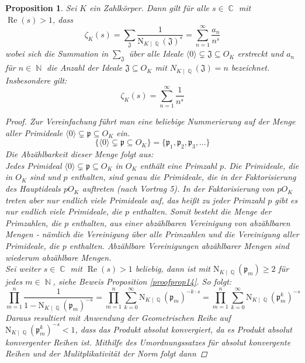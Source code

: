 \documentclass[10pt,a4paper]{article}
\theoremstyle{plain}
\newtheorem{prop}[thm]{Proposition}
\theoremstyle{definition}
\theoremstyle{remark}
\DeclareMathOperator{\C}{\mathbb{C}}
\DeclareMathOperator{\Q}{\mathbb{Q}}
\DeclareMathOperator{\N}{\mathbb{N}}
\DeclareMathOperator{\re}{Re}
\begin{document}
\begin{prop}

Sei $\textit{K}$ ein Zahlkörper. Dann gilt für alle $s \in \C $ mit $ \re(s)>1$, dass$$\zeta_{K}(s) = \sum_{\mathfrak{J}}\frac{1}{\mathrm{N}_{K\mid\Q}(\mathfrak{J})^s}=\sum_{n=1}^{\infty}\frac{a_n}{n^s}$$
wobei sich die Summation in $\sum_{\mathfrak{J}}$ über alle Ideale $\langle0\rangle\subsetneq \mathfrak{J} \subseteq O_{\textit{K}}$ erstreckt und $a_n$ für $n \in \N$ die Anzahl der Ideale $\mathfrak{J} \subseteq O_K$ mit $N_{K\mid \Q}(\mathfrak{J}) = n$ bezeichnet. Insbesondere gilt: $$\zeta_K{(s)}= \sum_{n=1}^{\infty}\frac{1}{n^s}$$

\begin{proof}

Zur Vereinfachung führt man eine beliebige Nummerierung auf der Menge aller Primideale $\langle0\rangle\subsetneq \mathfrak{p} \subseteq O_{\textit{K}}$ ein. $$\{\langle0\rangle\subsetneq \mathfrak{p} \subseteq O_{\textit{K}}\}=\{\mathfrak{p}_1,\mathfrak{p}_2,\mathfrak{p}_3,...\}$$Die Abzählbarkeit dieser Menge folgt aus: 
\\
Jedes Primideal $\langle0\rangle\subsetneq \mathfrak{p} \subseteq O_{K}$ in $O_K$ enthält eine Primzahl $p$. Die Primideale, die in $O_K$ sind und $p$ enthalten, sind genau die Primideale, die in der Faktorisierung des Hauptideals $pO_K$ auftreten (nach Vortrag 5). In der Faktorisierung von $pO_K$ treten aber nur endlich viele Primideale auf, das heißt zu jeder Primzahl $p$ gibt es nur endlich viele Primideale, die $p$ enthalten. Somit besteht die Menge der Primzahlen, die $p$ enthalten, aus einer abzählbaren Vereinigung von abzählbaren Mengen - nämlich die Vereinigung über alle Primzahlen und die Vereinigung aller Primideale, die $p$ enthalten. Abzählbare Vereinigungen abzählbarer Mengen sind wiederum abzählbare Mengen.
\\
Sei weiter $s \in \C $ mit $ \re(s) > 1$ beliebig, dann ist mit $\mathrm{N}_{K\mid \Q}(\mathfrak{p}_m)\geq 2$ für jedes $m \in \N$,  siehe Beweis Proposition \ref{proofprop14}. So folgt:$$\prod_{m=1}^{n}\frac{1}{1-\mathrm{N}_{K\mid \Q}(\mathfrak{p}_m)^{-s}} =\prod_{m=1}^{n}\sum_{k=0}^{\infty}\mathrm{N}_{K\mid \Q}(\mathfrak{p}_m)^{-k\cdot s}=\prod_{m=1}^{n}\sum_{k=0}^{\infty}\mathrm{N}_{K\mid \Q}(\mathfrak{p}_m^k)^{-s}$$
Daraus resultiert mit Anwendung der Geometrischen Reihe auf \\
$\mathrm{N}_{K\mid \Q}(\mathfrak{p}_m^k)^{-s} < 1$, dass das Produkt absolut konvergiert, da es Produkt absolut konvergenter Reihen ist. Mithilfe des Umordnungssatzes für absolut konvergente Reihen und der Mulitplikativität der Norm folgt dann

\end{proof}
\end{prop}
\end{document}
